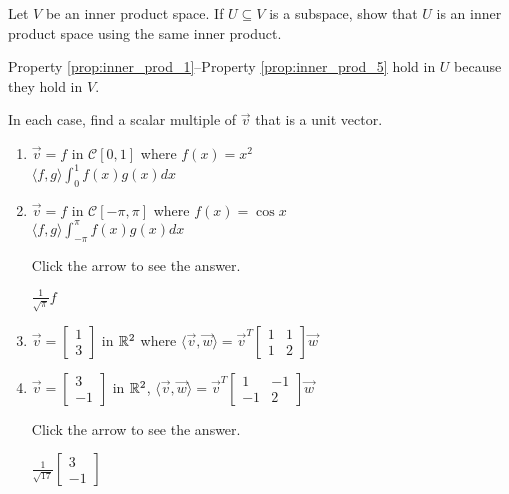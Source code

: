 \documentclass{ximera}
\begin{document}
\begin{problem}\label{prob:inner_prod_2}
Let $V$ be an inner product space. If $U \subseteq V$ is a subspace, show that $U$ is an inner product space using the same inner product.

\begin{hint}
 Property \ref{prop:inner_prod_1}--Property \ref{prop:inner_prod_5} hold in $U$ because they hold in $V$.
\end{hint}
\end{problem}

\begin{problem}\label{prob:inner_prod_3}
In each case, find a scalar multiple of $\vec{v}$ that is a unit vector.

\begin{enumerate} 
\item $\vec{v} = f$ in $\mathcal{C}[0, 1]$ where
$f(x) = x^2$  \\ $\langle f, g \rangle \int_{0}^{1} f(x)g(x)dx$

\item $\vec{v} = f$ in $\mathcal{C}[-\pi, \pi]$ where
$f(x) = \cos x$ \\ $\langle f, g \rangle \int_{-\pi}^{\pi} f(x)g(x)dx$

Click the arrow to see the answer.
\begin{expandable}
$\frac{1}{\sqrt{\pi}}f$
\end{expandable}

\item $\vec{v} =
\left[ \begin{array}{r}
1 \\
3
\end{array} \right]$
in $\mathbb{R}^2$ where $\langle \vec{v}, \vec{w} \rangle = \vec{v}^T
\left[ \begin{array}{rr}
1 & 1 \\
1 & 2
\end{array} \right]
\vec{w}$

\item $ \vec{v} =
\left[ \begin{array}{r}
3 \\
-1
\end{array} \right]$
in $\mathbb{R}^2$, $\langle \vec{v}, \vec{w} \rangle = \vec{v}^T
\left[ \begin{array}{rr}
1 & -1 \\
-1 & 2
\end{array} \right]
\vec{w}$

Click the arrow to see the answer.
\begin{expandable}
$\frac{1}{\sqrt{17}}
\left[ \begin{array}{r}
3 \\
-1
\end{array} \right]$
\end{expandable}

\end{enumerate}
\end{problem}
\end{document}

